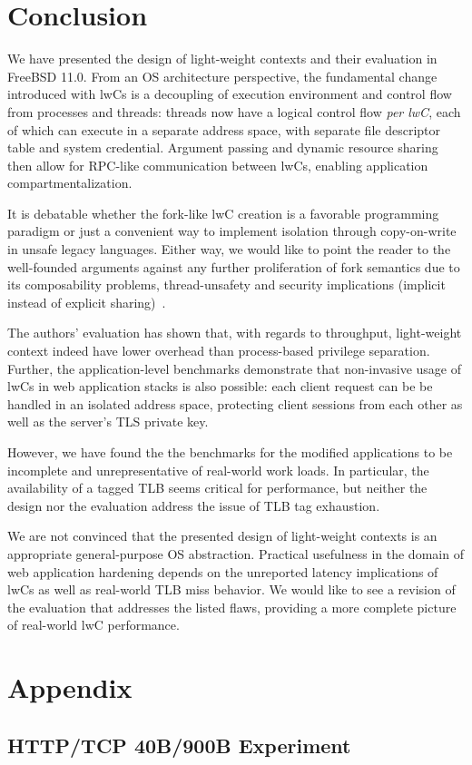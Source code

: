 \documentclass[10pt,twocolumn,a4paper]{article}
\begin{document}
\section{Conclusion}\label{conclusion}
We have presented the design of light-weight contexts and their evaluation in FreeBSD 11.0.
From an OS architecture perspective, the fundamental change introduced with lwCs is a decoupling of execution environment and control flow from processes and threads:
threads now have a logical control flow \textit{per lwC}, each of which can execute in a separate address space, with separate file descriptor table and system credential.
Argument passing and dynamic resource sharing then allow for RPC-like communication between lwCs, enabling application compartmentalization.

It is debatable whether the fork-like lwC creation is a favorable programming paradigm or just a convenient way to implement isolation through copy-on-write in unsafe legacy languages.
Either way, we would like to point the reader to the well-founded arguments against any further proliferation of fork semantics due to its composability problems, thread-unsafety and security implications (implicit instead of explicit sharing)~\cite{baumann2019a}.

The authors' evaluation has shown that, with regards to throughput, light-weight context indeed have lower overhead than process-based privilege separation.
Further, the application-level benchmarks demonstrate that non-invasive usage of lwCs in web application stacks is also possible:
each client request can be be handled in an isolated address space, protecting client sessions from each other as well as the server's TLS private key.

However, we have found the the benchmarks for the modified applications to be incomplete and unrepresentative of real-world work loads.
In particular, the availability of a tagged TLB seems critical for performance, but neither the design nor the evaluation address the issue of TLB tag exhaustion.

We are not convinced that the presented design of light-weight contexts is an appropriate general-purpose OS abstraction.
Practical usefulness in the domain of web application hardening depends on the unreported latency implications of lwCs as well as real-world TLB miss behavior.
We would like to see a revision of the evaluation that addresses the listed flaws, providing a more complete picture of real-world lwC performance.

\onecolumn
\section{Appendix}

\subsection{HTTP/TCP 40B/900B Experiment}\label{appendix:httppayloads}



\twocolumn
\nocite{*}
\clearpage
\printbibliography
\end{document}
